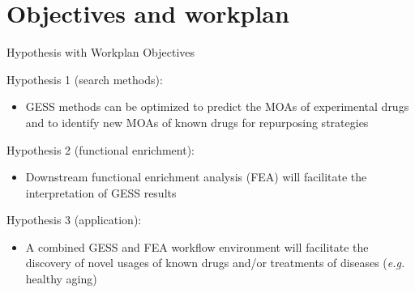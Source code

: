 \documentclass[10pt]{beamer}
\begin{document}
\section{Objectives and workplan}
\begin{frame}{Hypothesis with Workplan Objectives}
\vspace{-0.1cm}
    \begin{alertblock}{Hypothesis 1 (search methods):}
    	\begin{itemize}
            \item \alert{GESS methods can be optimized to predict the MOAs of experimental drugs and to identify new MOAs of known drugs for repurposing strategies}
    	\end{itemize}
    \end{alertblock}
    
    \begin{alertblock}{Hypothesis 2 (functional enrichment):}
    	\begin{itemize}
            \item \alert{Downstream functional enrichment analysis (FEA) will facilitate the interpretation of GESS results}
     	\end{itemize}
    \end{alertblock} 
     \begin{alertblock}{Hypothesis 3 (application):}
    \begin{itemize}
    \item \alert{A combined GESS and FEA workflow environment will facilitate the discovery of novel usages of known drugs and/or treatments of diseases (\textit{e.g.} healthy aging)}  
    \end{itemize}
        \end{alertblock} 
\end{frame}
\end{document}
